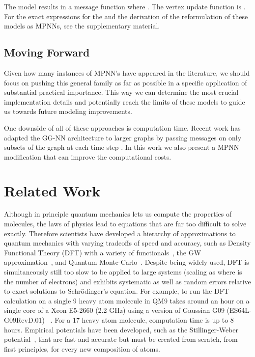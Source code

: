 \documentclass{article}
\begin{document}
    The \citet{kipf2016} model results in a message function  where . The vertex update function is . For the exact expressions for the  and the derivation of the reformulation of these models as MPNNs, see the supplementary material. 

        
\subsection{ Moving Forward}
Given how many instances of MPNN’s have appeared in the literature, we should focus on pushing this general family as far as possible in a specific application of substantial practical importance. This way we can determine the most crucial implementation details and potentially reach the limits of these models to guide us towards future modeling improvements.

One downside of all of these approaches is computation time. Recent work has adapted the GG-NN architecture to larger graphs by passing messages on only subsets of the graph at each time step \citep{marino2016more}. In this work we also present a MPNN modification that can improve the computational costs.


\section{Related Work}



Although in principle quantum mechanics lets us compute the properties of molecules, the laws of physics lead to equations that are far too difficult to solve exactly. Therefore scientists have developed a hierarchy of approximations to quantum mechanics with varying tradeoffs of speed and accuracy, such as Density Functional Theory (DFT) with a variety of functionals~\citep{becke93, hohenberg64}, the GW approximation~\citep{hedin65}, and Quantum Monte-Carlo~\citep{ceperley86}. Despite being widely used, DFT is simultaneously still too slow to be applied to large systems (scaling as  where  is the number of electrons) and exhibits systematic as well as random errors relative to exact solutions to Schr\"odinger's equation. For example, to run the DFT calculation on a single 9 heavy atom molecule in QM9 takes around an hour on a single core of a Xeon E5-2660 (2.2 GHz) using  a version of Gaussian G09 (ES64L-G09RevD.01) ~\citep{bing2016pc}. For a 17 heavy atom molecule, computation time is up to 8 hours. Empirical potentials have been developed, such as the Stillinger-Weber potential~\citep{stillinger85}, that are fast and accurate but must be created from scratch, from first principles, for every new composition of atoms.
\end{document}
